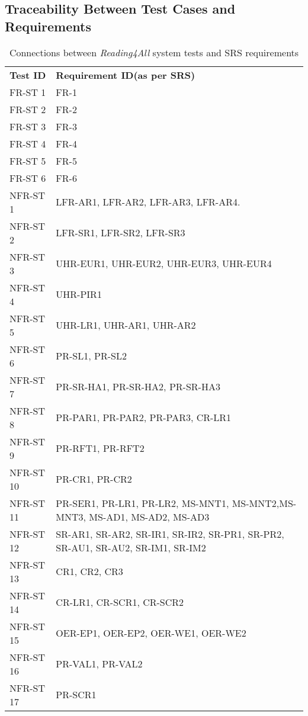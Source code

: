 \documentclass[12pt, titlepage]{article}
\begin{document}
\subsection{Traceability Between Test Cases and Requirements}

\begin{longtable}{|p{8.0cm}|p{8.0cm}|}
  \captionsetup{justification=raggedright,singlelinecheck=false}
  \caption{Connections between \textit{Reading4All} system tests and
  SRS requirements}
  \label{tab:sys-tests} \\
  \toprule
  {\textbf{Test ID}} & {\textbf{Requirement ID(as per SRS)}}\\
  \midrule
  FR-ST 1 & FR-1 \\ \hline
  FR-ST 2 & FR-2 \\ \hline
  FR-ST 3 & FR-3 \\ \hline
  FR-ST 4 & FR-4 \\ \hline
  FR-ST 5 & FR-5 \\ \hline
  FR-ST 6 & FR-6 \\ \hline
  NFR-ST 1 & LFR-AR1, LFR-AR2, LFR-AR3, LFR-AR4. \\ \hline
  NFR-ST 2 & LFR-SR1, LFR-SR2, LFR-SR3 \\ \hline
  NFR-ST 3 & UHR-EUR1, UHR-EUR2, UHR-EUR3, UHR-EUR4 \\ \hline
  NFR-ST 4 & UHR-PIR1 \\ \hline
  NFR-ST 5 & UHR-LR1, UHR-AR1, UHR-AR2\\ \hline
  NFR-ST 6 & PR-SL1, PR-SL2\\ \hline
  NFR-ST 7 & PR-SR-HA1, PR-SR-HA2, PR-SR-HA3 \\ \hline
  NFR-ST 8 & PR-PAR1, PR-PAR2, PR-PAR3, CR-LR1 \\ \hline
  NFR-ST 9 & PR-RFT1, PR-RFT2 \\ \hline
  NFR-ST 10 & PR-CR1, PR-CR2 \\ \hline
  NFR-ST 11 & PR-SER1, PR-LR1, PR-LR2, MS-MNT1, MS-MNT2,MS-MNT3, MS-AD1, MS-AD2, MS-AD3 \\ \hline
  NFR-ST 12 & SR-AR1, SR-AR2, SR-IR1, SR-IR2, SR-PR1, SR-PR2, SR-AU1, SR-AU2, SR-IM1, SR-IM2 \\ \hline
  NFR-ST 13 & CR1, CR2, CR3 \\ \hline
  NFR-ST 14 & CR-LR1, CR-SCR1, CR-SCR2 \\ \hline
  NFR-ST 15 & OER-EP1, OER-EP2, OER-WE1, OER-WE2 \\ \hline
  NFR-ST 16 & PR-VAL1, PR-VAL2 \\ \hline
  NFR-ST 17 & PR-SCR1 \\ \hline

\end{longtable}
\end{document}
